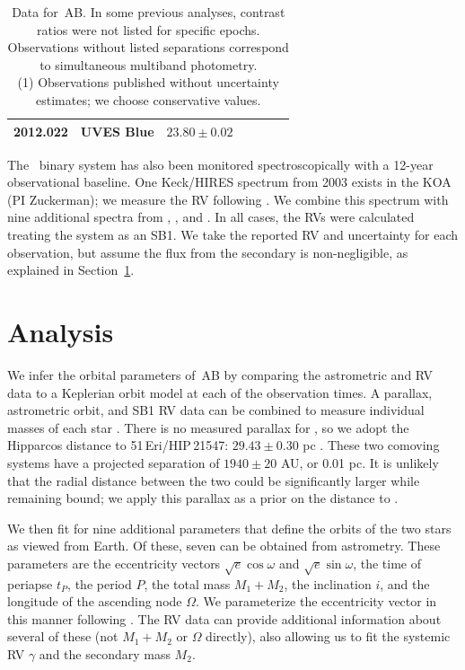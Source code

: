 \begin{landscape}
\begin{table}[hbt!]
\begin{center}
\begin{tabular}{lcccccc}
2012.022 & UVES Blue &        $23.80 \pm 0.02$   &        &       &         &  \citet{Elliott14} \\
\hline
\end{tabular}
\caption[Data for \thisstarsix\,AB]{Data for \thisstarsix\,AB. In some previous analyses, contrast ratios were not listed for specific epochs.
Observations without listed separations correspond to simultaneous multiband photometry. \\
(1) Observations published without uncertainty estimates; we choose conservative
values.}
\end{center}
\label{tab:astrometry}
\end{table}
\end{landscape}
\clearpage



The \thisstarsix\ binary system has also been monitored spectroscopically with a 12-year observational baseline.
One Keck/HIRES spectrum from 2003 exists in the KOA (PI Zuckerman); we measure
the RV following \citet{Kraus15}.
We combine this spectrum with nine additional spectra from \citet{Bailey12}, \citet{Shkolnik12},
and \citet{Elliott14}.
In all cases, the RVs were calculated treating the system as an SB1.
We take the reported RV and uncertainty for each observation, but assume the flux from the secondary
is non-negligible, as explained in Section~\ref{sec:analysis}.

\section{Analysis}
\label{sec:analysis}



We infer the orbital parameters of \thisstarsix\,AB by comparing the astrometric
and RV data to a Keplerian orbit model at each of the observation
times.
A parallax, astrometric orbit, and SB1 RV data can be combined to measure individual
masses of each star \citep[e.g.][]{Bean07}.
There is no measured parallax for \thisstarsix, so we adopt the Hipparcos distance to 51\,Eri/HIP\,21547: 
$29.43 \pm 0.30$ pc \citep{vanLeeuwen07}.
These two comoving systems have a projected separation of $1940 \pm 20$ AU,
or 0.01 pc. It is unlikely that the radial distance between the two could
be significantly larger while remaining bound; we apply this parallax
as a prior on the distance to \thisstarsix.

We then fit for nine additional parameters that define the orbits of
the two stars as viewed from Earth.
Of these, seven can be obtained from astrometry.
These parameters are the eccentricity vectors $\sqrt{e} \cos{\omega}$ and
$\sqrt{e} \sin{\omega}$, the time of periapse $t_P$, the period $P$, 
the total mass $M_1 + M_2$, the inclination $i$, and the 
longitude of the ascending node $\Omega$.
We parameterize the eccentricity vector in this manner following \citet{Eastman13}.
The RV data can provide additional information about several of these
(not $M_1 + M_2$ or $\Omega$ directly), also allowing us to fit the
systemic RV $\gamma$ and the secondary mass $M_2$.



